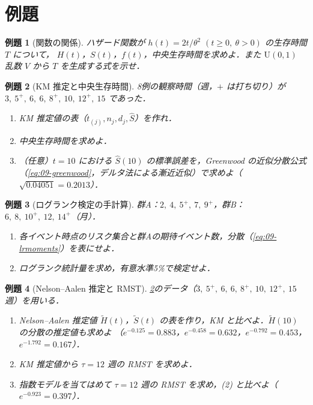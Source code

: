 \documentclass[a4paper,11pt,openany]{ltjsbook}
\newtheorem{reidai}{例題}[chapter]
\newcommand{\Unif}{\mathrm{U}}
\begin{document}
\section{例題}\label{sec:09-ex}
\begin{reidai}[関数の関係]\label{reidai:09-1}
ハザード関数が $h(t)=2t/\theta^2$ $(t\ge0,\ \theta>0)$ の生存時間 $T$ について，
$H(t)$，$S(t)$，$f(t)$，中央生存時間を求めよ．また $\Unif(0,1)$ 乱数 $V$ から $T$ を生成する式を示せ．
\end{reidai}

\begin{reidai}[KM 推定と中央生存時間]\label{reidai:09-2}
8例の観察時間（週，$+$ は打ち切り）が $3,\ 5^+,\ 6,\ 6,\ 8^+,\ 10,\ 12^+,\ 15$ であった．
\begin{enumerate}[label=(\arabic*)]
\item KM 推定値の表（$t_{(j)},n_j,d_j,\hat S$）を作れ．
\item 中央生存時間を求めよ．
\item （任意）$t=10$ における $\hat S(10)$ の標準誤差を，Greenwood の近似分散公式（\cref{eq:09-greenwood}，デルタ法による漸近近似）で求めよ（$\sqrt{0.04051}=0.2013$）．
\end{enumerate}
\end{reidai}

\begin{reidai}[ログランク検定の手計算]\label{reidai:09-3}
群A：$2,\ 4,\ 5^+,\ 7,\ 9^+$，群B：$6,\ 8,\ 10^+,\ 12,\ 14^+$（月）．
\begin{enumerate}[label=(\arabic*)]
\item 各イベント時点のリスク集合と群Aの期待イベント数，分散（\cref{eq:09-lrmoments}）を表にせよ．
\item ログランク統計量を求め，有意水準5\%で検定せよ．
\end{enumerate}
\end{reidai}

\begin{reidai}[Nelson--Aalen 推定と RMST]\label{reidai:09-4}
\cref{reidai:09-2}のデータ（$3,\ 5^+,\ 6,\ 6,\ 8^+,\ 10,\ 12^+,\ 15$ 週）を用いる．
\begin{enumerate}[label=(\arabic*)]
\item Nelson--Aalen 推定値 $\tilde H(t)$，$\tilde S(t)$ の表を作り，KM と比べよ．$\tilde H(10)$ の分散の推定値も求めよ
（$e^{-0.125}=0.883$，$e^{-0.458}=0.632$，$e^{-0.792}=0.453$，$e^{-1.792}=0.167$）．
\item KM 推定値から $\tau=12$ 週の RMST を求めよ．
\item 指数モデルを当てはめて $\tau=12$ 週の RMST を求め，(2) と比べよ（$e^{-0.923}=0.397$）．
\end{enumerate}
\end{reidai}
\end{document}
